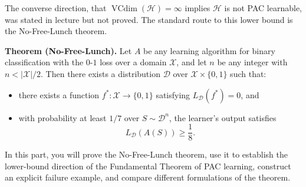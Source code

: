 \documentclass[11pt]{article}
\begin{document}
The converse direction, that $\operatorname{VCdim}(\mathcal{H})=\infty$ implies $\mathcal{H}$ is not PAC learnable, was stated in lecture but not proved. The standard route to this lower bound is the No-Free-Lunch theorem.

\medskip

\textbf{Theorem (No-Free-Lunch).}
Let $A$ be any learning algorithm for binary classification with the $0$-$1$ loss over a domain $\mathcal X$, and let $n$ be any integer with $n<|\mathcal X|/2$. Then there exists a distribution $\mathcal D$ over $\mathcal X\times\{0,1\}$ such that:
\begin{itemize}
    \item[(i)] there exists a function $f^*: \mathcal X\to\{0,1\}$ satisfying $L_{\mathcal D}(f^*)=0$, and
    \item[(ii)] with probability at least $1/7$ over $S\sim \mathcal D^n$, the learner’s output satisfies
    \[
    L_{\mathcal D}(A(S))\ge \frac{1}{8}.
    \]
\end{itemize}

\medskip

In this part, you will prove the No-Free-Lunch theorem, use it to establish the lower-bound direction of the Fundamental Theorem of PAC learning, construct an explicit failure example, and compare different formulations of the theorem.

\medskip
\end{document}
